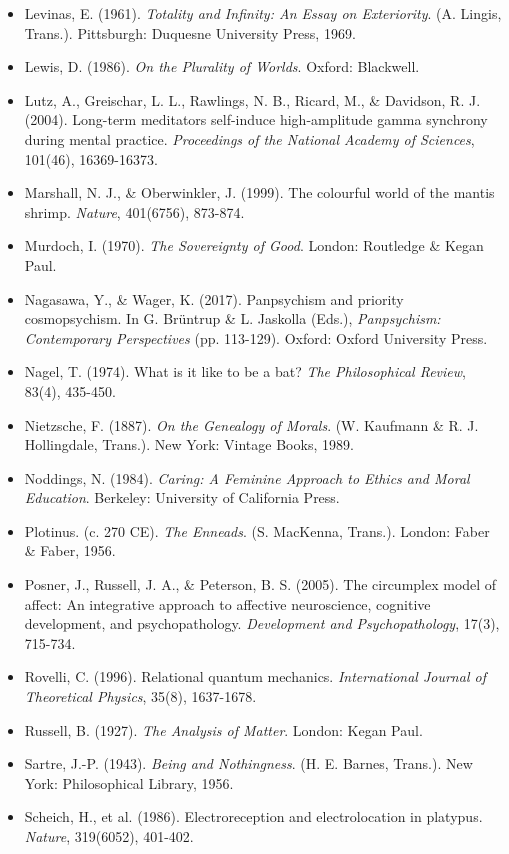 \begin{itemize}[nosep,leftmargin=*]
  \item Levinas, E. (1961). \textit{Totality and Infinity: An Essay on Exteriority}. (A. Lingis, Trans.). Pittsburgh: Duquesne University Press, 1969.
  \item Lewis, D. (1986). \textit{On the Plurality of Worlds}. Oxford: Blackwell.
  \item Lutz, A., Greischar, L. L., Rawlings, N. B., Ricard, M., \& Davidson, R. J. (2004). Long-term meditators self-induce high-amplitude gamma synchrony during mental practice. \textit{Proceedings of the National Academy of Sciences}, 101(46), 16369-16373.
  \item Marshall, N. J., \& Oberwinkler, J. (1999). The colourful world of the mantis shrimp. \textit{Nature}, 401(6756), 873-874.
  \item Murdoch, I. (1970). \textit{The Sovereignty of Good}. London: Routledge \& Kegan Paul.
  \item Nagasawa, Y., \& Wager, K. (2017). Panpsychism and priority cosmopsychism. In G. Brüntrup \& L. Jaskolla (Eds.), \textit{Panpsychism: Contemporary Perspectives} (pp. 113-129). Oxford: Oxford University Press.
  \item Nagel, T. (1974). What is it like to be a bat? \textit{The Philosophical Review}, 83(4), 435-450.
  \item Nietzsche, F. (1887). \textit{On the Genealogy of Morals}. (W. Kaufmann \& R. J. Hollingdale, Trans.). New York: Vintage Books, 1989.
  \item Noddings, N. (1984). \textit{Caring: A Feminine Approach to Ethics and Moral Education}. Berkeley: University of California Press.
  \item Plotinus. (c. 270 CE). \textit{The Enneads}. (S. MacKenna, Trans.). London: Faber \& Faber, 1956.
  \item Posner, J., Russell, J. A., \& Peterson, B. S. (2005). The circumplex model of affect: An integrative approach to affective neuroscience, cognitive development, and psychopathology. \textit{Development and Psychopathology}, 17(3), 715-734.
  \item Rovelli, C. (1996). Relational quantum mechanics. \textit{International Journal of Theoretical Physics}, 35(8), 1637-1678.
  \item Russell, B. (1927). \textit{The Analysis of Matter}. London: Kegan Paul.
  \item Sartre, J.-P. (1943). \textit{Being and Nothingness}. (H. E. Barnes, Trans.). New York: Philosophical Library, 1956.
  \item Scheich, H., et al. (1986). Electroreception and electrolocation in platypus. \textit{Nature}, 319(6052), 401-402.

\end{itemize}
